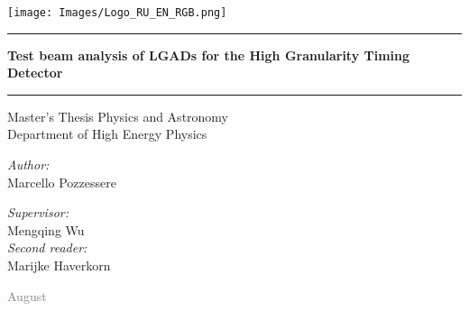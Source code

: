 \begin{titlepage}
    \begin{center}
        \texttt{[image: Images/Logo\_RU\_EN\_RGB.png]}

        \vspace{1cm}
        
        \rule{\textwidth}{1pt}
        \par
        \vspace{1cm}
        {\Huge\bfseries Test beam analysis of LGADs for the High Granularity Timing Detector}
        \vspace{1cm}
        \par
        \rule{\textwidth}{1pt}
        
        \vspace{1cm}
        
        \LARGE
        Master's Thesis Physics and Astronomy \\
        \vspace{.5cm}
        Department of High Energy Physics
            
        \vspace{2.5cm}
            
        \noindent
        \begin{minipage}[t]{0.48\textwidth}
        \raggedright
            \textit{Author:}\\
            Marcello Pozzessere
        \end{minipage}
        \hfill
        \begin{minipage}[t]{0.48\textwidth}
            \raggedleft
            \textit{Supervisor:}\\
            Mengqing Wu \\
            \vspace{.5cm}
            \textit{Second reader:}\\
            Marijke Haverkorn
        
        \end{minipage}
        \vfill
        \textcolor{gray}{\Large August \the\year}
    \end{center}
\end{titlepage}